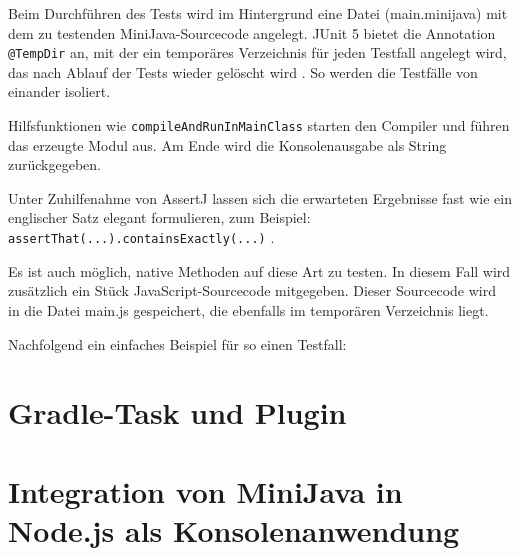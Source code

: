 Beim Durchführen des Tests wird im Hintergrund eine Datei (main.minijava) mit dem zu testenden MiniJava-Sourcecode angelegt. JUnit 5 bietet die Annotation \lstinline{@TempDir} an, mit der ein temporäres Verzeichnis für jeden Testfall angelegt wird, das nach Ablauf der Tests wieder gelöscht wird \cite{JUnit}. So werden die Testfälle von einander isoliert.

Hilfsfunktionen wie \lstinline{compileAndRunInMainClass} starten den Compiler und führen das erzeugte Modul aus. Am Ende wird die Konsolenausgabe als String zurückgegeben.

Unter Zuhilfenahme von AssertJ lassen sich die erwarteten Ergebnisse fast wie ein englischer Satz elegant formulieren, zum Beispiel: \lstinline{assertThat(...).containsExactly(...)} \cite{AssertJ}.

Es ist auch möglich, native Methoden auf diese Art zu testen. In diesem Fall wird zusätzlich ein Stück JavaScript-Sourcecode mitgegeben. Dieser Sourcecode wird in die Datei main.js gespeichert, die ebenfalls im temporären Verzeichnis liegt.

Nachfolgend ein einfaches Beispiel für so einen Testfall:



\section{Gradle-Task und Plugin}

\section{Integration von MiniJava in Node.js als Konsolenanwendung}
